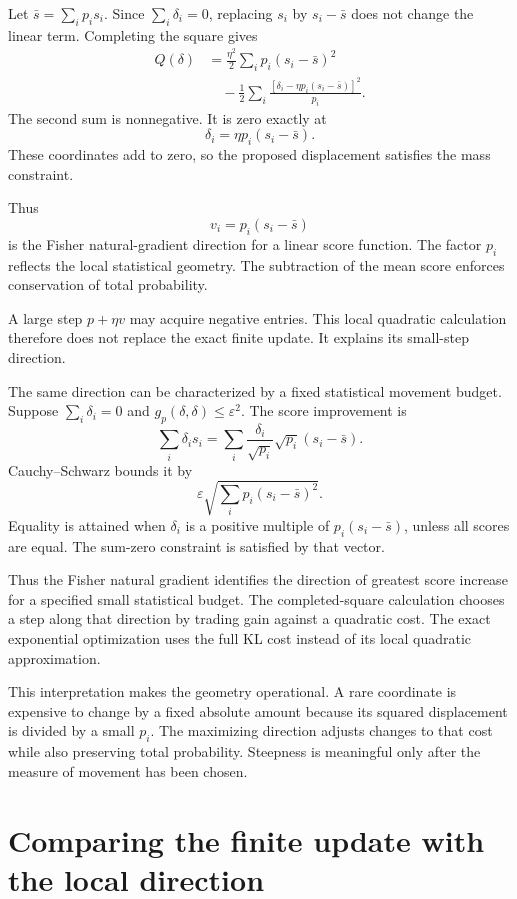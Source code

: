 \documentclass[11pt,oneside,openany]{book}
\theoremstyle{definition}
\theoremstyle{remark}
\numberwithin{equation}{chapter}
\begin{document}
Let \(\bar s=\sum_i p_i s_i\). Since \(\sum_i\delta_i=0\), replacing \(s_i\) by \(s_i-\bar s\) does not change the linear term. Completing the square gives \[\begin{aligned}
Q(\delta)
&=\frac{\eta^2}{2}\sum_i p_i(s_i-\bar s)^2\\
&\quad-\frac12\sum_i
\frac{[\delta_i-\eta p_i(s_i-\bar s)]^2}{p_i}.
\end{aligned}\] The second sum is nonnegative. It is zero exactly at \[\boxed{\delta_i=\eta p_i(s_i-\bar s).}\] These coordinates add to zero, so the proposed displacement satisfies the mass constraint.

Thus \[v_i=p_i(s_i-\bar s)\] is the Fisher natural-gradient direction for a linear score function. The factor \(p_i\) reflects the local statistical geometry. The subtraction of the mean score enforces conservation of total probability.

A large step \(p+\eta v\) may acquire negative entries. This local quadratic calculation therefore does not replace the exact finite update. It explains its small-step direction.

The same direction can be characterized by a fixed statistical movement budget. Suppose \(\sum_i\delta_i=0\) and \(g_p(\delta,\delta)\leq\varepsilon^2\). The score improvement is \[\sum_i\delta_i s_i
=\sum_i\frac{\delta_i}{\sqrt{p_i}}\sqrt{p_i}(s_i-\bar s).\] Cauchy--Schwarz bounds it by \[\varepsilon\sqrt{\sum_i p_i(s_i-\bar s)^2}.\] Equality is attained when \(\delta_i\) is a positive multiple of \(p_i(s_i-\bar s)\), unless all scores are equal. The sum-zero constraint is satisfied by that vector.

Thus the Fisher natural gradient identifies the direction of greatest score increase for a specified small statistical budget. The completed-square calculation chooses a step along that direction by trading gain against a quadratic cost. The exact exponential optimization uses the full KL cost instead of its local quadratic approximation.

This interpretation makes the geometry operational. A rare coordinate is expensive to change by a fixed absolute amount because its squared displacement is divided by a small \(p_i\). The maximizing direction adjusts changes to that cost while also preserving total probability. Steepness is meaningful only after the measure of movement has been chosen.

\section{Comparing the finite update with the local direction}\label{ch09-comparing-the-finite-update-with-the-local-direction}
\end{document}
